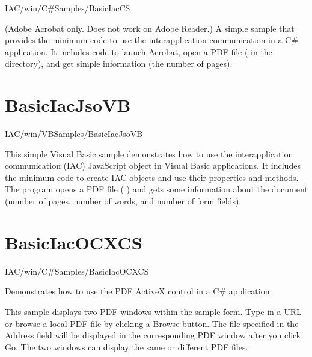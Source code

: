 \documentclass[letterpaper,12pt,english,openany,oneside]{sphinxmanual}
\begin{document}
IAC/win/C\#Samples/BasicIacCS

\label{\detokenize{Samples_WindowsIAC:description-5}}

(Adobe Acrobat only. Does not work on Adobe Reader.) A simple sample that provides the minimum code to use the interapplication communication in a C\# application. It includes code to launch Acrobat, open a PDF file ( in the  directory), and get simple information (the number of pages).


\section{BasicIacJsoVB}
\label{\detokenize{Samples_WindowsIAC:basiciacjsovb}}\label{\detokenize{Samples_WindowsIAC:location-6}}

IAC/win/VBSamples/BasicIacJsoVB

\label{\detokenize{Samples_WindowsIAC:description-6}}

This simple Visual Basic sample demonstrates how to use the interapplication communication (IAC) JavaScript object in Visual Basic applications. It includes the minimum code to create IAC objects and use their properties and methods. The program opens a PDF file ( ) and gets some information about the document (number of pages, number of words, and number of form fields).


\section{BasicIacOCXCS}
\label{\detokenize{Samples_WindowsIAC:basiciacocxcs}}\label{\detokenize{Samples_WindowsIAC:location-7}}

IAC/win/C\#Samples/BasicIacOCXCS

\label{\detokenize{Samples_WindowsIAC:description-7}}

Demonstrates how to use the PDF ActiveX control in a C\# application.

\label{\detokenize{Samples_WindowsIAC:usage-5}}

This sample displays two PDF windows within the sample form. Type in a URL or browse a local PDF file by clicking a Browse button. The file specified in the Address field will be displayed in the corresponding PDF window after you click Go. The two windows can display the same or different PDF files.
\end{document}

